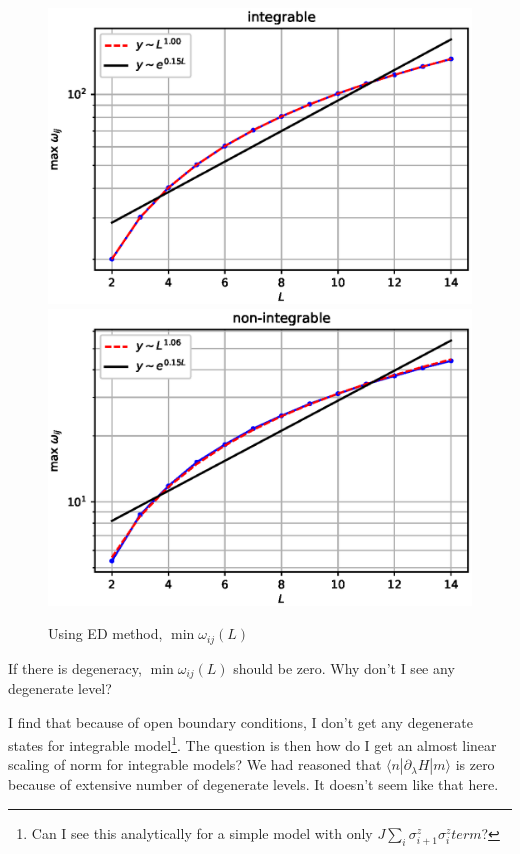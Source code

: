 \documentclass[11pt,a4paper]{article}
\begin{document}
 
\begin{figure}[!ht]
\begin{center}
\includegraphics[scale=0.7]{new_pics/v2_maxwij_int.eps} \\
\includegraphics[scale=0.7]{new_pics/v2_maxwij_nonint.eps}
\caption{Using ED method, $\min \omega_{ij}(L)$}
\end{center}
\end{figure}
If there is degeneracy, $\min \omega_{ij}(L)$ should be zero. Why don't I see any degenerate level?

I find that because of open boundary conditions, I don't get any degenerate states for integrable model\footnote{Can I see this analytically for a simple model with only $J \sum_i\sigma_{i+1}^z \sigma_{i}^z term$?}. The question is then how do I get an almost linear scaling of norm for integrable models? We had reasoned that $\langle n| \partial_{\lambda} H|m\rangle$ is zero because of extensive number of degenerate levels. It doesn't seem like that here.
\end{document}
